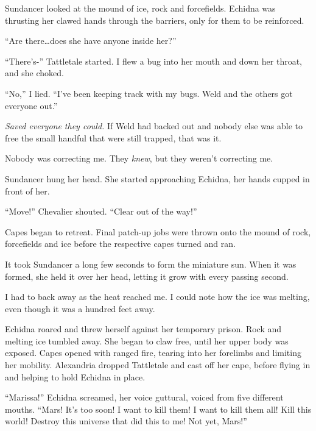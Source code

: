 Sundancer looked at the mound of ice, rock and forcefields.  Echidna was thrusting her clawed hands through the barriers, only for them to be reinforced.



``Are there\ldots does she have anyone inside her?''



``There's-'' Tattletale started.  I flew a bug into her mouth and down her throat, and she choked.



``No,'' I lied.  ``I've been keeping track with my bugs.  Weld and the others got everyone out.''



\emph{Saved everyone they could.  }If Weld had backed out and nobody else was able to free the small handful that were still trapped, that was it.



Nobody was correcting me.  They \emph{knew}, but they weren't correcting me.



Sundancer hung her head.  She started approaching Echidna, her hands cupped in front of her.



``Move!''  Chevalier shouted.  ``Clear out of the way!''



Capes began to retreat.  Final patch-up jobs were thrown onto the mound of rock, forcefields and ice before the respective capes turned and ran.



It took Sundancer a long few seconds to form the miniature sun.  When it was formed, she held it over her head, letting it grow with every passing second.



I had to back away as the heat reached me.  I could note how the ice was melting, even though it was a hundred feet away.



Echidna roared and threw herself against her temporary prison.  Rock and melting ice tumbled away.  She began to claw free, until her upper body was exposed.  Capes opened with ranged fire, tearing into her forelimbs and limiting her mobility.  Alexandria dropped Tattletale and cast off her cape, before flying in and helping to hold Echidna in place.



``Marissa!''  Echidna screamed, her voice guttural, voiced from five different mouths.  ``Mars!  It's too soon!  I want to kill them!  I want to kill them all!  Kill this world!  Destroy this universe that did this to me!  Not yet, Mars!''



